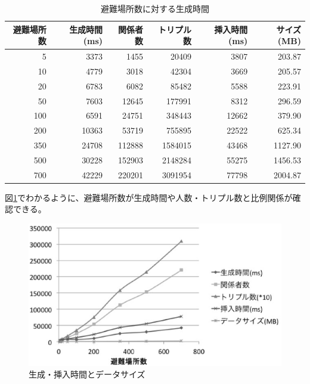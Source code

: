 \begin{table}[h!]
	\begin{center}
	\begin{tabular}{| r | r | r | r | r | r |}
		\hline
		\rowstyle{\bfseries}
		避難場所数 & 生成時間(ms) & 関係者数 & トリプル数 & 挿入時間(ms) & サイズ(MB) \\
		\hline
		5 & 3373 & 1455 & 20409 & 3807 & 203.87 \\
		\hline
		10 & 4779 & 3018 & 42304 & 3669 & 205.57 \\
		\hline
		20 & 6783 & 6082 & 85482 & 5588 & 223.91 \\
		\hline
		50 & 7603 & 12645 & 177991 & 8312 & 296.59 \\
		\hline
		100 & 6591 & 24751 & 348443 & 12662 & 379.90 \\
		\hline
		200 & 10363 & 53719 & 755895 & 22522 & 625.34 \\
		\hline
		350 & 24708 & 112888 & 1584015 & 43468 & 1127.90 \\
		\hline
		500 & 30228 & 152903 & 2148284 & 55275 & 1456.53 \\
		\hline
		700 & 42229 & 220201 & 3091954 & 77798 & 2004.87 \\
		\hline
	\end{tabular}
	\caption{避難場所数に対する生成時間}
	\label{table:sibm_time_table}
	\end{center}
\end{table}

図\ref{fig:sibm_data_time}でわかるように、避難場所数が生成時間や人数・トリプル数と比例関係が確認できる。

\begin{figure}[t!]
 	\begin{center}
 		\includegraphics[width=120mm]{./images/test_chart1.eps}
 		\caption{生成・挿入時間とデータサイズ}
 		\label{fig:sibm_data_time}
 	\end{center}
\end{figure}

